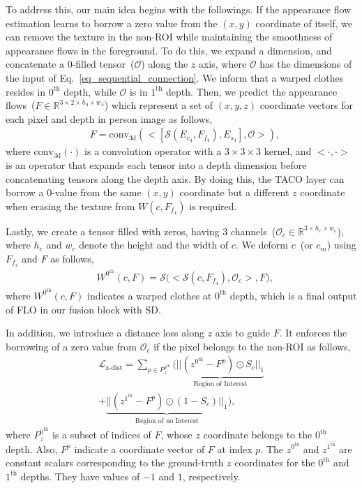 \documentclass[letterpaper]{article} %
\begin{document}
To address this, our main idea begins with the followings.
If the appearance flow estimation learns to borrow a zero value from the $(x,y)$ coordinate of itself, we can remove the texture in the non-ROI while maintaining the smoothness of appearance flows in the foreground.
To do this, we expand a dimension, and concatenate a 0-filled tensor~($\mathcal{O}$) along the $z$ axis, where $\mathcal{O}$ has the dimensions of the input of Eq.~\ref{eq_sequential_connection}.
We inform that a warped clothes resides in $0^{\text{th}}$ depth, while $\mathcal{O}$ is in $1^{\text{th}}$ depth.
Then, we predict the appearance flows~($F \in \mathbb{R}^{3 \times 2 \times h_4 \times w_4}$) which represent a set of $(x,y,z)$ coordinate vectors for each pixel and depth in person image as follows,
\begin{eqnarray}
& F = \text{conv}_{\text{3d}}(\big<[\mathcal{S}(E_{{c}_{4}}, F_{f_{4}}), E_{{s}_{4}}], \mathcal{O}\big>),
\label{eq_af_0_filled}
\end{eqnarray}
where $\text{conv}_{\text{3d}}(\cdot)$ is a convolution operator with a $3\times 3\times 3$ kernel, and $\big< \cdot, \cdot \big>$ is an operator that expands each tensor into a depth dimension before concatenating tensors along the depth axis.
By doing this, the TACO layer can borrow a $0$-value from the same $(x,y)$ coordinate but a different $z$ coordinate when erasing the texture from $W(c,F_{f_4})$ is required.

Lastly, we create a tensor filled with zeros, having 3 channels~($\mathcal{O}_c \in \mathbb{R}^{3 \times h_c \times w_c}$), where $h_c$ and $w_c$ denote the height and the width of $c$. We deform $c$~(or $c_m$) using $F_{f_4}$ and $F$ as follows,
\begin{eqnarray}
   & W^{0^{\text{th}}}(c,F) = \mathcal{S}\big(\big<\mathcal{S}(c, F_{f_{4}}), \mathcal{O}_c \big>, F \big),
\end{eqnarray}
where $W^{0^{\text{th}}}(c,F)$ indicates a warped clothes at $0^{\text{th}}$ depth, which is a final output of FLO in our fusion block with SD.

In addition, we introduce a distance loss along $z$ axis to guide $F$.
It enforces the borrowing of a zero value from $\mathcal{O}_c$ if the pixel belongs to the non-ROI as follows,
\begin{eqnarray}
    \mathcal{L}_{\text{z-dist}} = \sum\limits_{p \in P_z^{0^{\text{th}}}}(\underbrace{|| (z^{0^{\text{th}}} - F^p) \odot S_c ||_1}_{\text{Region of Interest}} \nonumber \\ + \underbrace{|| (z^{1^{\text{th}}} - F^p ) \odot (1 - S_c) ||_1}_{\text{Region of no Interest}}),
\end{eqnarray}
where $P_z^{0^{\text{th}}}$ is a subset of indices of $F$, whose $z$ coordinate belongs to the $0^{\text{th}}$ depth.
Also, $F^p$ indicate a coordinate vector of $F$ at index $p$.
The $z^{0^{\text{th}}}$ and $z^{1^{\text{th}}}$ are constant scalars corresponding to the ground-truth $z$ coordinates for the $0^{\text{th}}$ and $1^{\text{th}}$ depths.
They have values of $-1$ and $1$, respectively.
\end{document}
